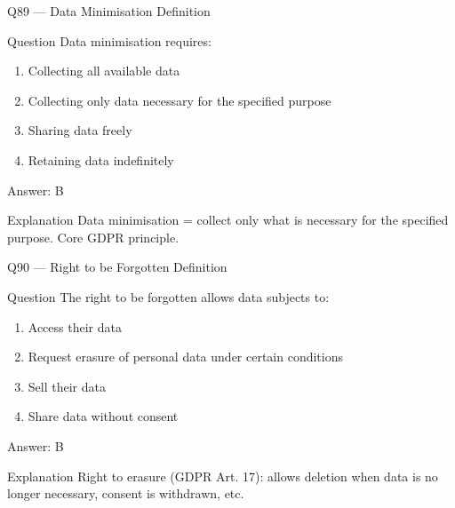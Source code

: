 \documentclass[aspectratio=169,8pt]{beamer}
\begin{document}
	\begin{frame}{Q89 --- Data Minimisation Definition}
		\begin{block}{Question}
			Data minimisation requires:
			\begin{enumerate}
				\item Collecting all available data
				\item Collecting only data necessary for the specified purpose
				\item Sharing data freely
				\item Retaining data indefinitely
			\end{enumerate}
		\end{block}
		\begin{exampleblock}{Answer: B}\end{exampleblock}
		\begin{block}{Explanation}
			Data minimisation = collect only what is necessary for the specified purpose. Core GDPR principle.
		\end{block}
	\end{frame}
	
	\begin{frame}{Q90 --- Right to be Forgotten Definition}
		\begin{block}{Question}
			The right to be forgotten allows data subjects to:
			\begin{enumerate}
				\item Access their data
				\item Request erasure of personal data under certain conditions
				\item Sell their data
				\item Share data without consent
			\end{enumerate}
		\end{block}
		\begin{exampleblock}{Answer: B}\end{exampleblock}
		\begin{block}{Explanation}
			Right to erasure (GDPR Art. 17): allows deletion when data is no longer necessary, consent is withdrawn, etc.
		\end{block}
	\end{frame}
	
\end{document}
